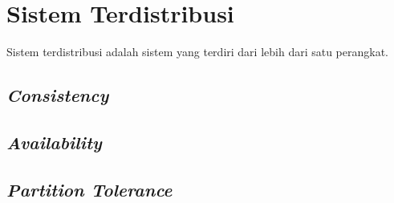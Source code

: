 \section{Sistem Terdistribusi}
\label{sec:sistem-terdistribusi}

Sistem terdistribusi adalah sistem yang terdiri dari lebih dari satu perangkat. 

\subsection{\textit{Consistency}}
\subsection{\textit{Availability}}
\subsection{\textit{Partition Tolerance}}

% 
% 
